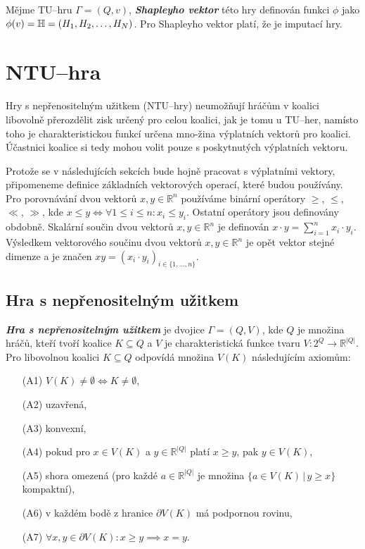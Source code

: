         Mějme TU--hru $\Gamma = (Q, v)$, \textit{\textbf{Shapleyho vektor}} této hry definován funkci $\phi$ jako $\phi(v) = \mathbb{H} = (H_1, H_2, \dots, \\H_N)$. Pro Shapleyho vektor platí, že je imputací hry.

\section{NTU--hra}
    \label{sec:NTU}
    Hry s nepřenositelným užitkem \cite{Coop_intro,Game_Theory,EOLSS} (NTU--hry) neumožňují hráčům v koalici libovolně přerozdělit zisk určený pro celou koalici, jak je tomu u TU--her, namísto toho je charakteristickou funkcí určena mno-žina výplatních vektorů pro koalici. Účastnici koalice si tedy mohou volit pouze s poskytnutých výplatních vektoru.

    Protože se v následujících sekcích bude hojně pracovat s výplatními vektory, připomeneme definice základních vektorových operací, které budou používány. Pro porovnávání dvou vektorů $x, y \in \mathbb{R}^n$ používáme binární operátory $\geqslant$, $\leqslant$, $\ll$, $\gg$, kde $x \leqslant y \iff \forall 1 \leq i \leq n: x_i \leq y_i$. Ostatní operátory jsou definovány obdobně. Skalární součin dvou vektorů $x, y \in \mathbb{R}^n$ je definován $x \cdot y = \sum^n_{i = 1}x_i \cdot y_i$. Výsledkem vektorového součinu dvou vektorů $x, y \in \mathbb{R}^n$ je opět vektor stejné dimenze a je značen $xy = (x_i \cdot y_i)_{i \in \{1, \dots, n\}}$.

    \subsection{Hra s nepřenositelným užitkem}
        \textit{\textbf{Hra s nepřenositelným užitkem}} je dvojice $\Gamma = (Q, V)$, kde $Q$ je množina hráčů, kteří tvoří koalice $K \subseteq Q$ a $V$ je charakteristická funkce tvaru $V: 2^Q \rightarrow \mathbb{R}^{|Q|}$. Pro libovolnou koalici $K \subseteq Q$ odpovídá množina $V(K)$ následujícím axiomům:

        \begin{itemize}
            \item[(A1)] $V(K) \neq \emptyset \iff K \neq \emptyset$,
            \item[(A2)] uzavřená,
            \item[(A3)] konvexní,
            \item[(A4)] pokud pro $x \in V(K)$ a $y \in \mathbb{R}^{|Q|}$ platí $x \geqslant y$, pak $y \in V(K)$,
            \item[(A5)] shora omezená (pro každé $a \in \mathbb{R}^{|Q|}$ je množina $\{a \in V(K)\,|\, y \geqslant x\}$ kompaktní),
            \item[(A6)] v každém bodě z hranice $\partial V(K)$ má podpornou rovinu,
            \item[(A7)] $\forall x, y \in \partial V(K): x \geqslant y \implies x = y$.
        \end{itemize}

